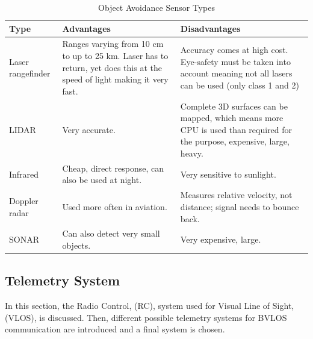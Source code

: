 \begin{table}
    \centering
    \caption{Object Avoidance Sensor Types\protect\footnotemark }
    \label{tab:obje_avoi}
    \begin{tabularx}{\textwidth}{>{\small}p{} >{\small}p{} L}
    \toprule \bfseries
    Type        & \bfseries Advantages            & \bfseries Disadvantages
    \\ \midrule
    Laser rangefinder     
    & Ranges varying from 10 cm to up to 25 km. Laser has to return, yet does this at the speed of light making it very fast.
    & Accuracy comes at high cost. Eye-safety must be taken into account meaning not all lasers can be used (only class 1 and 2)\footnotemark
    \\ \hdashline
    LIDAR       
    & Very accurate.
    & Complete 3D surfaces can be mapped, which means more CPU is used than required for the purpose, expensive, large, heavy.
    \\ \hdashline
    Infrared
    & Cheap, direct response, can also be used at night.
    & Very sensitive to sunlight.
    \\ \hdashline
    Doppler radar
    & Used more often in aviation.
    & Measures relative velocity, not distance; signal needs to bounce back.
    \\ \hdashline
    SONAR
    & Can also detect very small objects.
    & Very expensive, large.
    \\ \bottomrule
    \end{tabularx}
\end{table}





\addtocounter{footnote}{-2}



\subsection{Telemetry System}%
\label{sec:tele_syst}

In this section, the Radio Control, (RC), system used for Visual Line of Sight, (VLOS), is discussed. Then, different possible telemetry systems for BVLOS communication are introduced and a final system is chosen.

